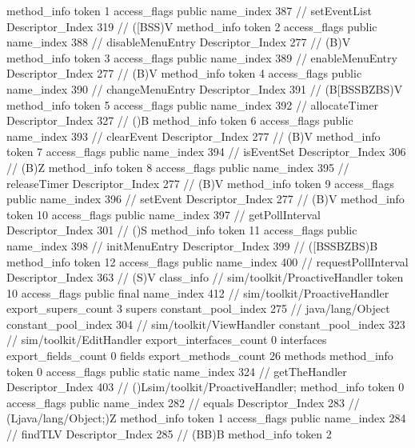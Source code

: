 {{{{				method_info {
					token	1
					access_flags	public
					name_index	387		// setEventList
					Descriptor_Index	319		// ([BSS)V
				}
				method_info {
					token	2
					access_flags	public
					name_index	388		// disableMenuEntry
					Descriptor_Index	277		// (B)V
				}
				method_info {
					token	3
					access_flags	public
					name_index	389		// enableMenuEntry
					Descriptor_Index	277		// (B)V
				}
				method_info {
					token	4
					access_flags	public
					name_index	390		// changeMenuEntry
					Descriptor_Index	391		// (B[BSSBZBS)V
				}
				method_info {
					token	5
					access_flags	public
					name_index	392		// allocateTimer
					Descriptor_Index	327		// ()B
				}
				method_info {
					token	6
					access_flags	public
					name_index	393		// clearEvent
					Descriptor_Index	277		// (B)V
				}
				method_info {
					token	7
					access_flags	public
					name_index	394		// isEventSet
					Descriptor_Index	306		// (B)Z
				}
				method_info {
					token	8
					access_flags	public
					name_index	395		// releaseTimer
					Descriptor_Index	277		// (B)V
				}
				method_info {
					token	9
					access_flags	public
					name_index	396		// setEvent
					Descriptor_Index	277		// (B)V
				}
				method_info {
					token	10
					access_flags	public
					name_index	397		// getPollInterval
					Descriptor_Index	301		// ()S
				}
				method_info {
					token	11
					access_flags	public
					name_index	398		// initMenuEntry
					Descriptor_Index	399		// ([BSSBZBS)B
				}
				method_info {
					token	12
					access_flags	public
					name_index	400		// requestPollInterval
					Descriptor_Index	363		// (S)V
				}
			}
		}
		class_info {		// sim/toolkit/ProactiveHandler
			token	10
			access_flags	public final
			name_index	412		// sim/toolkit/ProactiveHandler
			export_supers_count	3
			supers {
				constant_pool_index	275		// java/lang/Object
				constant_pool_index	304		// sim/toolkit/ViewHandler
				constant_pool_index	323		// sim/toolkit/EditHandler
			}
			export_interfaces_count	0
			interfaces {
			}
			export_fields_count	0
			fields {
			}
			export_methods_count	26
			methods {
				method_info {
					token	0
					access_flags	public static
					name_index	324		// getTheHandler
					Descriptor_Index	403		// ()Lsim/toolkit/ProactiveHandler;
				}
				method_info {
					token	0
					access_flags	public
					name_index	282		// equals
					Descriptor_Index	283		// (Ljava/lang/Object;)Z
				}
				method_info {
					token	1
					access_flags	public
					name_index	284		// findTLV
					Descriptor_Index	285		// (BB)B
				}
				method_info {
					token	2
}}}}}
